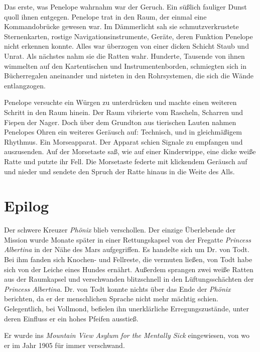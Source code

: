 \bigpar

Das erste, was Penelope wahrnahm war der Geruch. Ein süßlich
fauliger Dunst quoll ihnen entgegen. Penelope trat in den Raum, der
einmal eine Kommandobrücke gewesen war. Im Dämmerlicht sah sie
schmutzverkrustete Sternenkarten, rostige Navigationsinstrumente,
Geräte, deren Funktion Penelope nicht erkennen konnte. Alles war
überzogen von einer dicken Schicht Staub und Unrat. Als nächstes
nahm sie die Ratten wahr. Hunderte, Tausende von ihnen wimmelten
auf den Kartentischen und Instrumentenborden, schmiegten sich in
Bücherregalen aneinander und nisteten in den Rohrsystemen, die sich
die Wände entlangzogen.

\bigpar

Penelope versuchte ein Würgen zu unterdrücken und machte einen
weiteren Schritt in den Raum hinein. Der Raum vibrierte vom
Rascheln, Scharren und Fiepen der Nager. Doch über dem Grundton aus
tierischen Lauten nahmen Penelopes Ohren ein weiteres Geräusch auf:
Technisch, und in gleichmäßigem Rhythmus. Ein Morseapparat. Der
Apparat schien Signale zu empfangen und auszusenden. Auf der
Morsetaste saß, wie auf einer Kinderwippe, eine dicke weiße Ratte
und putzte ihr Fell. Die Morsetaste federte mit klickendem Geräusch
auf und nieder und sendete den Spruch der Ratte hinaus in die Weite
des Alls.

\section{Epilog}

Der schwere Kreuzer \textit{Phönix} blieb verschollen. Der einzige
Überlebende der Mission wurde Monate später in einer Rettungskapsel
von der Fregatte \textit{Princess Albertina} in der Nähe des Mars
aufgegriffen. Es handelte sich um Dr. von Todt. Bei ihm fanden sich
Knochen- und Fellreste, die vermuten ließen, von Todt habe sich von
der Leiche eines Hundes ernährt. Außerdem sprangen zwei weiße
Ratten aus der Raumkapsel und verschwanden blitzschnell in den
Lüftungsschächten der \textit{Princess Albertina}. Dr. von Todt konnte
nichts über das Ende der \textit{Phönix} berichten, da er der menschlichen
Sprache nicht mehr mächtig schien. Gelegentlich, bei Vollmond,
befielen ihn unerklärliche Erregungszustände, unter deren Einfluss
er ein hohes Pfeifen ausstieß.

Er wurde ins \textit{Mountain View Asylum for the Mentally Sick}
eingewiesen, von wo er im Jahr 1905 für immer verschwand.

\bigpar


